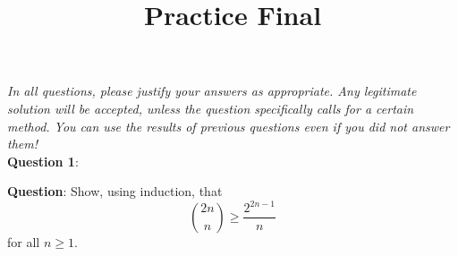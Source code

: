 \documentclass{amsart}
\title{Practice Final}
\begin{document}
	
	\maketitle 
	
	\textit{In all questions, please justify your answers as appropriate. Any legitimate solution will be accepted, unless the question specifically calls for a certain method. You can use the results of previous questions even if you did not answer them!}\\
	
	\noindent \textbf{Question 1}: 
	
	\newpage 
	
	
	\noindent \textbf{Question}: Show, using induction, that 
	$$
	{2n \choose n} \geq \frac{2^{2n-1}}{n}
	$$
	for all $n\geq 1$.
	
\end{document}
